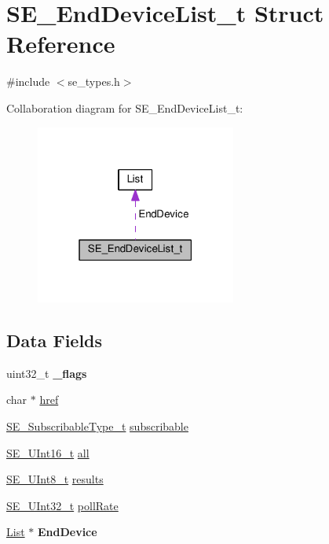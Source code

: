 \hypertarget{structSE__EndDeviceList__t}{}\section{S\+E\+\_\+\+End\+Device\+List\+\_\+t Struct Reference}
\label{structSE__EndDeviceList__t}


{\ttfamily \#include $<$se\+\_\+types.\+h$>$}



Collaboration diagram for S\+E\+\_\+\+End\+Device\+List\+\_\+t\+:\nopagebreak
\begin{figure}[H]
\begin{center}
\leavevmode
\includegraphics[width=187pt]{structSE__EndDeviceList__t__coll__graph}
\end{center}
\end{figure}
\subsection*{Data Fields}
\begin{DoxyCompactItemize}
\item 
uint32\+\_\+t {\bfseries \+\_\+flags}
\item 
char $\ast$ \hyperlink{group__EndDeviceList_ga2dee4395bae5adb1b32a956a23a94d05}{href}
\item 
\hyperlink{group__SubscribableType_ga5c41f553d369710ed34619266bf2551e}{S\+E\+\_\+\+Subscribable\+Type\+\_\+t} \hyperlink{group__EndDeviceList_ga2b2e8f1980c958770b758272899979d0}{subscribable}
\item 
\hyperlink{group__UInt16_gac68d541f189538bfd30cfaa712d20d29}{S\+E\+\_\+\+U\+Int16\+\_\+t} \hyperlink{group__EndDeviceList_gabb9e8efdbe6326b1cdf0aef5b232b73d}{all}
\item 
\hyperlink{group__UInt8_gaf7c365a1acfe204e3a67c16ed44572f5}{S\+E\+\_\+\+U\+Int8\+\_\+t} \hyperlink{group__EndDeviceList_gabaccd9c1e6895d28cbee5cc2eca2b23e}{results}
\item 
\hyperlink{group__UInt32_ga70bd4ecda3c0c85d20779d685a270cdb}{S\+E\+\_\+\+U\+Int32\+\_\+t} \hyperlink{group__EndDeviceList_gaadffae7b67b10a6e379b98a3e43f1c5e}{poll\+Rate}
\item 
\hyperlink{structList}{List} $\ast$ {\bfseries End\+Device}
\end{DoxyCompactItemize}


